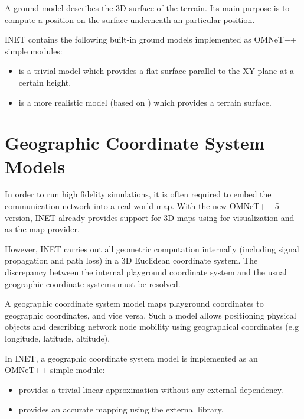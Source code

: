 A ground model describes the 3D surface of the terrain. Its main purpose is
to compute a position on the surface underneath an particular position.

INET contains the following built-in ground models implemented as
OMNeT++ simple modules:

\begin{itemize}
    \item {} is a trivial model which provides a flat surface parallel to the XY plane at a certain height.
    \item {} is a more realistic model (based on ) which provides a terrain surface.
\end{itemize}

\section{Geographic Coordinate System Models}
\label{sec:environment:geographic-coordinate-system-models}

In order to run high fidelity simulations, it is often required to embed
the communication network into a real world map. With the new OMNeT++ 5
version, INET already provides support for 3D maps using
 for visualization and  as the map
provider.

However, INET carries out all geometric computation internally (including
signal propagation and path loss) in a 3D Euclidean coordinate system. The
discrepancy between the internal playground coordinate system and the usual
geographic coordinate systems must be resolved.

A geographic coordinate system model maps playground coordinates to
geographic coordinates, and vice versa. Such a model allows positioning
physical objects and describing network node mobility using geographical
coordinates (e.g longitude, latitude, altitude).

In INET, a geographic coordinate system model is implemented as an OMNeT++
simple module:

\begin{itemize}
    \item {} provides a trivial linear approximation without any external dependency.
    \item {} provides an accurate mapping using the external  library.
\end{itemize}

